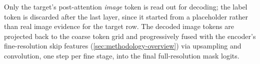 Only the target's post-attention \emph{image} token is read out for
decoding; the label token is discarded after the last layer, since it
started from a placeholder rather than real image evidence for the target
row. The decoded image tokens are projected back to the coarse token grid
and progressively fused with the encoder's fine-resolution skip features
(\autoref{sec:methodology-overview}) via upsampling and convolution, one step
per fine stage, into the final full-resolution mask logits.
